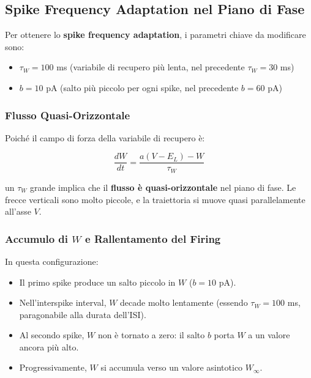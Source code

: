 \subsection{Spike Frequency Adaptation nel Piano di Fase}


Per ottenere lo \textbf{spike frequency adaptation}, i parametri chiave da modificare sono:

\begin{itemize}
    \item $\tau_W = 100$ ms (variabile di recupero più lenta, nel precedente $\tau_W = 30$ ms)
    \item $b = 10$ pA (salto più piccolo per ogni spike, nel precedente $b = 60$ pA)
\end{itemize}

\subsubsection{Flusso Quasi-Orizzontale}

Poiché il campo di forza della variabile di recupero è:

\begin{equation}
\frac{dW}{dt} = \frac{a(V - E_L) - W}{\tau_W}
\end{equation}

un $\tau_W$ grande implica che il \textbf{flusso è quasi-orizzontale} nel piano di fase. Le frecce verticali sono molto piccole, e la traiettoria si muove quasi parallelamente all'asse $V$.

\subsubsection{Accumulo di $W$ e Rallentamento del Firing}

In questa configurazione:

\begin{itemize}
    \item Il primo spike produce un salto piccolo in $W$ ($b = 10$ pA).
    \item Nell'interspike interval, $W$ decade molto lentamente (essendo $\tau_W = 100$ ms, paragonabile alla durata dell'ISI).
    \item Al secondo spike, $W$ non è tornato a zero: il salto $b$ porta $W$ a un valore ancora più alto.
    \item Progressivamente, $W$ si accumula verso un valore asintotico $W_\infty$.
\end{itemize}

